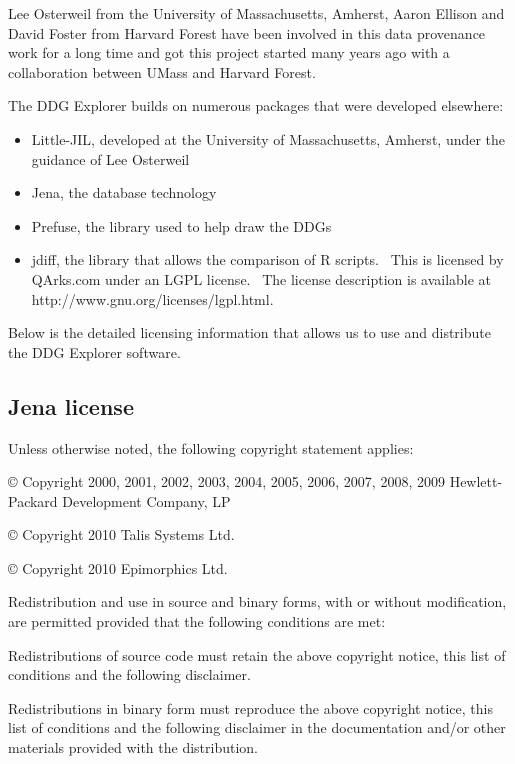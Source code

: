 \documentclass[letterpaper]{article}
\newcommand\liststyleWWviiiNumvii{%
\renewcommand\labelitemi{•}
\renewcommand\labelitemii{•}
\renewcommand\labelitemiii{•}
\renewcommand\labelitemiv{•}
}
\begin{document}
{\mdseries\upshape\color{black}
Lee Osterweil from the University of Massachusetts, Amherst, Aaron Ellison and David Foster from Harvard Forest have been involved in this data provenance work for a long time and got this project started many years ago with a collaboration between UMass and Harvard Forest.}

{\mdseries\upshape\color{black}
The DDG Explorer builds on numerous packages that were developed elsewhere:}

\liststyleWWviiiNumvii
\begin{itemize}
\item {\color{black}
Little-JIL, developed at the University of Massachusetts, Amherst, under the guidance of Lee Osterweil}
\item {\color{black}
Jena, the database technology}
\item {\color{black}
Prefuse, the library used to help draw the DDGs}
\item {\color{black}
jdiff, the library that allows the comparison of R scripts. \ This is licensed by QArks.com under an LGPL license. \ The license description is available at http://www.gnu.org/licenses/lgpl.html.}
\end{itemize}
{\mdseries\upshape\color{black}
Below is the detailed licensing information that allows us to use and distribute the DDG Explorer software.}

\subsection{Jena license}
{\mdseries\upshape\color{black}
Unless otherwise noted, the following copyright statement applies:}

{\mdseries\upshape\color{black}
© Copyright 2000, 2001, 2002, 2003, 2004, 2005, 2006, 2007, 2008, 2009 Hewlett-Packard Development Company, LP}

{\mdseries\upshape\color{black}
© Copyright 2010 Talis Systems Ltd.}

{\mdseries\upshape\color{black}
© Copyright 2010 Epimorphics Ltd.}

{\mdseries\upshape\color{black}
Redistribution and use in source and binary forms, with or without modification, are permitted provided that the following conditions are met:}

{\mdseries\upshape\color{black}
Redistributions of source code must retain the above copyright notice, this list of conditions and the following disclaimer.}

{\mdseries\upshape\color{black}
Redistributions in binary form must reproduce the above copyright notice, this list of conditions and the following disclaimer in the documentation and/or other materials provided with the distribution.}
\end{document}
